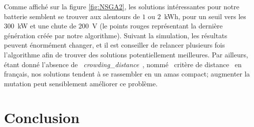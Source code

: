 \documentclass[11pt, a4paper, oneside, portrait]{report}
\begin{document}
        Comme affiché sur la figure \ref{fig:NSGA2}, les solutions intéressantes pour notre batterie semblent se trouver aux alentours de $1$ ou $2$~kWh, pour un seuil vers les $300$~kW et une chute de $200$~V (le points rouges représentant la dernière génération créée par notre algorithme).
        Suivant la simulation, les résultats peuvent énormément changer, et il est conseiller de relancer plusieurs fois l'algorithme afin de trouver des solutions potentiellement meilleures.
        Par ailleurs, étant donné l'absence de \guillemotleft{}~\emph{crowding\_distance}~\guillemotright{}, nommé \guillemotleft{}~critère de distance~\guillemotright{} en français, nos solutions tendent à se rassembler en un amas compact; augmenter la mutation peut sensiblement améliorer ce problème.


    \section*{Conclusion}
\end{document}
